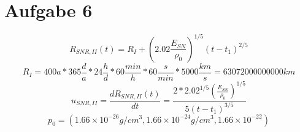 \section{Aufgabe 6}
\begin{equation}
R_{SNR,II}(t)=R_I + \left( 2.02 \frac{E_{SN}}{\rho_0} \right) ^{1/5}(t-t_1)^{2/5}
\end{equation}
\begin{equation}
R_I=400 a * 365 \frac{d}{a} * 24 \frac{h}{d} * 60 \frac{min}{h} * 60 \frac{s}{min} * 5000 \frac{km}{s} = 63072000000000 km
\end{equation}
\begin{equation}
u_{SNR,II} = \frac{dR_{SNR,II}(t)}{dt}=\frac{2 * 2.02^{1/5} \left( \frac{E_{SN}}{\rho_0} \right) ^{1/5}}{5(t-t_1)^{3/5}}
\end{equation}
\begin{equation}
p_0 = \left( 1.66 \times 10^{-26} g/cm^3, 1.66 \times 10^{-24} g/cm^3, 1.66 \times 10^{-22} \right)
\end{equation}
\begin{figure}[ht]
\begin{center}
\end{center}
\end{figure}
\begin{figure}[ht]
\begin{center}
\end{center}
\end{figure}

